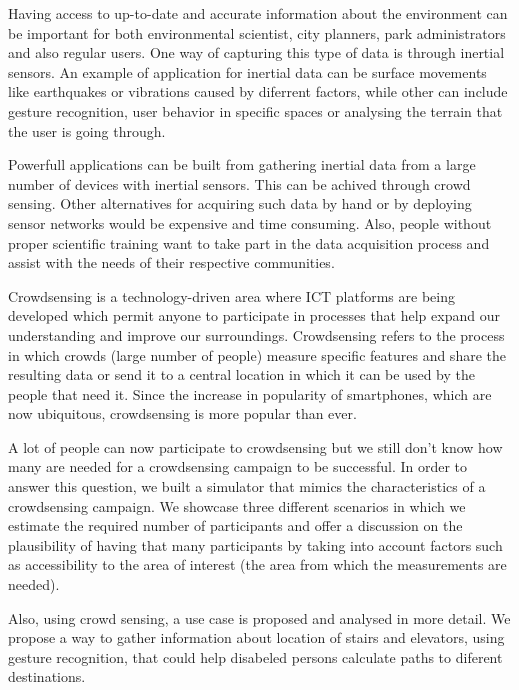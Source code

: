 
Having access to up-to-date and accurate information about the environment can 
be important for both environmental scientist, city planners, 
park administrators and also regular users. One way of capturing this type of data is through inertial sensors. An example of application for inertial data can be
surface movements like earthquakes or vibrations caused by diferrent 
factors, while other can include gesture recognition, user behavior
in specific spaces or analysing the terrain that the user is going through.

Powerfull applications can be built from gathering inertial data from
a large number of devices with inertial sensors. This can be achived
 through crowd sensing. Other alternatives for acquiring such data by hand
or by deploying sensor networks would be expensive and time consuming.
Also, people without proper scientific
training want to take part in the data acquisition process and assist
with the needs of their respective communities.


Crowdsensing is a
technology-driven area where ICT platforms are being developed
which permit anyone to participate in processes that help expand
our understanding and improve our surroundings. Crowdsensing
refers to the process in which crowds (large number of people)
measure specific features and share the resulting data or send it
to a central location in which it can be used by the people that
need it. Since the
increase in popularity of smartphones, which are now ubiquitous,
crowdsensing is more popular than ever.

A lot of people can now participate to crowdsensing but we still
don’t know how many are needed for a crowdsensing campaign
to be successful. In order to answer this question, we built a
simulator that mimics the characteristics of a crowdsensing campaign.
 We showcase three different scenarios in which we estimate
the required number of participants and offer a discussion on
the plausibility of having that many participants by taking into
account factors such as accessibility to the area of interest (the
area from which the measurements are needed).

Also, using crowd sensing, a use case is proposed and analysed in more
 detail. We propose a way to gather information about location
 of stairs and elevators, using gesture recognition, that could help disabeled
 persons calculate paths to diferent destinations.

